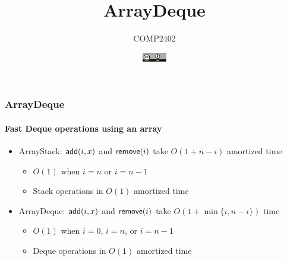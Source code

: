 \documentclass[aspectratio=169,xcolor=dvipsnames]{beamer}
\title{ArrayDeque}
\author{COMP2402}
\date{\includegraphics[height=1em]{by}}
\begin{document}
\begin{frame}
  \titlepage
\end{frame}

\begin{frame}
  \frametitle{ArrayDeque}
  \framesubtitle{Fast Deque operations using an array}

  \begin{itemize}
    \item<+-> ArrayStack: $\mathsf{add}(i,x)$ and $\mathsf{remove}(i)$ take $O(1+n-i)$ amortized time
    \begin{itemize}
      \item<+-> $O(1)$ when $i=n$ or $i=n-1$
      \item<+-> Stack operations in $O(1)$ amortized time
    \end{itemize}
    \item<+-> ArrayDeque: $\mathsf{add}(i,x)$ and $\mathsf{remove}(i)$ take $O(1+\min\{i,n-i\})$ time
    \begin{itemize}
      \item<+-> $O(1)$ when $i=0$, $i=n$, or $i=n-1$
      \item<+-> Deque operations in $O(1)$ amortized time
    \end{itemize}
  \end{itemize}
\end{frame}
\end{document}
